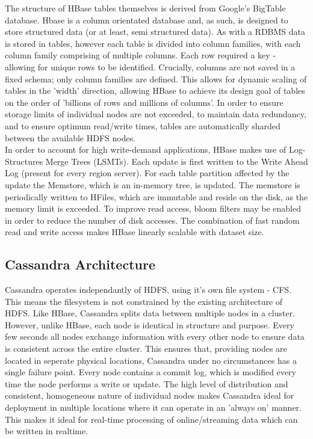 \documentclass[10pt]{article}
\begin{document}
The structure of HBase tables themselves is derived from Google's BigTable database. Hbase is a column orientated database and, as such, is designed to store structured data (or at least, semi structured data). As with a RDBMS data is stored in tables, however each table is divided into column families, with each column family comprising of multiple columns. Each row required a key - allowing for unique rows to be identified. Crucially, columns are not saved in a fixed schema; only column families are defined. This allows for dynamic scaling of tables in the 'width' direction, allowing HBase to achieve its design goal of tables on the order of 'billions of rows and millions of columns'. In order to ensure storage limits of individual nodes are not exceeded, to maintain data redundancy, and to ensure optimum read/write times, tables are automatically sharded between the available HDFS nodes.\\

In order to account for high write-demand applications, HBase makes use of Log-Structures Merge Trees (LSMTs). Each update is first written to the Write Ahead Log (present for every region server). For each table partition affected by the update the Memstore, which is an in-memory tree, is updated. The memstore is periodically written to HFiles,  which are immutable and reside on the disk, as the memory limit is exceeded. To improve read access, bloom filters may be enabled in order to reduce the number of disk accesses. The combination of fast random read and write access makes HBase linearly scalable with dataset size.\\

\subsection{Cassandra Architecture}
Cassandra operates independantly of HDFS, using it's own file system - CFS. This means the filesystem is not constrained by the existing architecture of HDFS. Like HBase, Cassandra splits data between multiple nodes in a cluster. However, unlike HBase, each node is identical in structure and purpose. Every few seconds all nodes exchange information with every other node to ensure data is consistent across the entire cluster. This ensures that, providing nodes are located in seperate physical locations, Cassandra under no circumstances has a single failure point. Every node contains a commit log, which is modified every time the node performs a write or update. The high level of distribution and consistent, homogeneous nature of individual nodes makes Cassandra ideal for deployment in multiple locations where it can operate in an 'always on' manner. This makes it ideal for real-time processing of online/streaming data which can be written in realtime.\\
\end{document}
